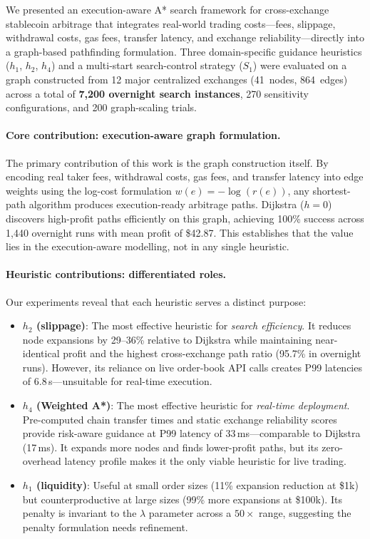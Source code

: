 We presented an execution-aware A* search framework for cross-exchange stablecoin arbitrage that integrates real-world trading costs—fees, slippage, withdrawal costs, gas fees, transfer latency, and exchange reliability—directly into a graph-based pathfinding formulation. Three domain-specific guidance heuristics ($h_1$, $h_2$, $h_4$) and a multi-start search-control strategy ($S_1$) were evaluated on a graph constructed from 12 major centralized exchanges (41~nodes, 864~edges) across a total of \textbf{7{,}200 overnight search instances}, 270 sensitivity configurations, and 200 graph-scaling trials.

\paragraph{Core contribution: execution-aware graph formulation.}
The primary contribution of this work is the graph construction itself. By encoding real taker fees, withdrawal costs, gas fees, and transfer latency into edge weights using the log-cost formulation $w(e) = -\log(r(e))$, any shortest-path algorithm produces execution-ready arbitrage paths. Dijkstra ($h{=}0$) discovers high-profit paths efficiently on this graph, achieving 100\% success across 1{,}440 overnight runs with mean profit of \$42.87. This establishes that the value lies in the execution-aware modelling, not in any single heuristic.

\paragraph{Heuristic contributions: differentiated roles.}
Our experiments reveal that each heuristic serves a distinct purpose:
\begin{itemize}
    \item \textbf{$h_2$ (slippage)}: The most effective heuristic for \emph{search efficiency}. It reduces node expansions by 29--36\% relative to Dijkstra while maintaining near-identical profit and the highest cross-exchange path ratio (95.7\% in overnight runs). However, its reliance on live order-book API calls creates P99 latencies of 6.8\,s—unsuitable for real-time execution.
    \item \textbf{$h_4$ (Weighted A*)}: The most effective heuristic for \emph{real-time deployment}. Pre-computed chain transfer times and static exchange reliability scores provide risk-aware guidance at P99 latency of 33\,ms—comparable to Dijkstra (17\,ms). It expands more nodes and finds lower-profit paths, but its zero-overhead latency profile makes it the only viable heuristic for live trading.
    \item \textbf{$h_1$ (liquidity)}: Useful at small order sizes (11\% expansion reduction at \$1k) but counterproductive at large sizes (99\% more expansions at \$100k). Its penalty is invariant to the $\lambda$ parameter across a $50\times$ range, suggesting the penalty formulation needs refinement.
\end{itemize}

